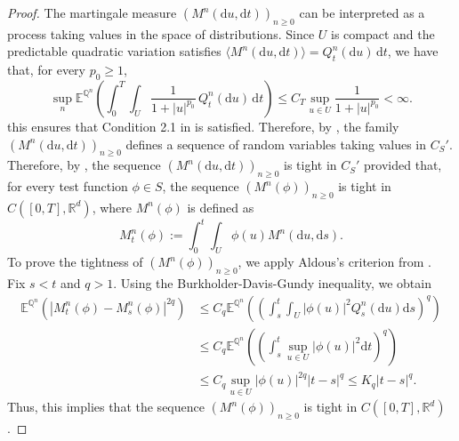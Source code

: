 \documentclass[11pt,amsfonts]{article}
\theoremstyle{plain}
\theoremstyle{assumpstyle}
\numberwithin{equation}{section}
\numberwithin{theorem}{section}
\numberwithin{proposition}{section}
\numberwithin{definition}{section}
\numberwithin{remark}{section}
\numberwithin{corollary}{section}
\numberwithin{lemma}{section}
\begin{document}
\begin{proof}
The martingale measure $(M^n(\mathrm{d}u, \mathrm{d}t))_{n \geq 0}$ can be interpreted as a process taking values in the space of distributions. Since $U$ is compact and the predictable quadratic variation satisfies $\langle M^n(\mathrm{d}u, \mathrm{d}t) \rangle = Q^n_t(\mathrm{d}u)\, \mathrm{d}t$, 
we have that, for every $p_0 \geq 1$,
\begin{equation}\label{Condition 2.1}
\sup_{n} \mathbb{E}^{\mathbb{Q}^n} \left(
\int_{0}^{T} \int_{U} \frac{1}{1+|u|^{p_0}}\, Q^n_t(\mathrm{d}u)\, \mathrm{d}t
\right)
\leq C_T \sup_{u \in U} \frac{1}{1+|u|^{p_0}} < \infty .
\end{equation}
this ensures that Condition 2.1 in \cite{Cho} is satisfied. Therefore, by \cite[Lemma 2.1]{Cho}, the family $(M^n(\mathrm{d}u, \mathrm{d}t))_{n \geq 0}$ defines a sequence of random variables taking values in $C_S'$.\\
 Therefore, by \cite[Theorem 3.1]{mitoma}, the sequence $(M^n(\mathrm{d}u, \mathrm{d}t))_{n \geq 0}$ is tight in $C_S' $ provided that, for every test function $\phi \in S$, the sequence $(M^n(\phi))_{n \geq 0}$ is tight in $C([0, T], \mathbb{R}^d)$, where $M^n(\phi)$ is defined as
\begin{equation*}
M^n_t(\phi) := \int_0^t \int_U \phi(u) M^n(\mathrm{d}u, \mathrm{d}s).
\end{equation*}
To prove the tightness of $(M^n(\phi))_{n \geq 0}$, we apply Aldous’s criterion from \cite[Theorem 16.10]{Bellin}. \\
Fix $s < t$ and $q > 1$. Using the Burkholder-Davis-Gundy inequality, we obtain
\begin{align*}
\mathbb{E}^{\mathbb{Q}^n}\left(|M^n_t(\phi) - M^n_s(\phi)|^{2q}\right) & \leq C_q \mathbb{E}^{\mathbb{Q}^n} \left( \left( \int_s^t \int_U |\phi(u)|^2 Q^n_s (\mathrm{d}u) \mathrm{d}s \right)^q \right)\\
&\leq C_q \mathbb{E}^{\mathbb{Q}^n} \left( \left( \int_s^t \sup_{u \in U} |\phi(u)|^2 \mathrm{d}t \right)^q \right)\\
&\leq C_q \sup_{u \in U} |\phi(u)|^{2q} |t - s|^q \leq K_q |t - s|^q.
\end{align*}
Thus, this implies that the sequence $(M^n(\phi))_{n \geq 0}$ is tight in $C([0, T], \mathbb{R}^d)$.


\end{proof}
\end{document}
